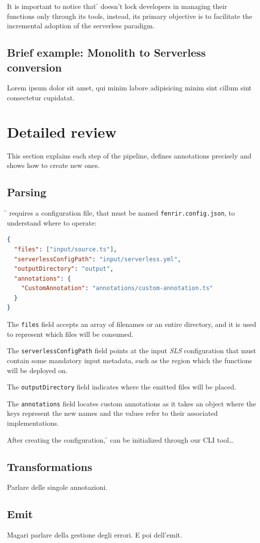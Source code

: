 It is important to notice that \f{} doesn't lock developers in managing their
functions only through its tools, instead, its primary objective is to facilitate
the incremental adoption of the serverless paradigm.

\subsection{Brief example: Monolith to Serverless conversion}

Lorem ipsum dolor sit amet, qui minim labore adipisicing minim sint cillum sint consectetur cupidatat.

\section{Detailed review}

This section explains each step of the pipeline, defines annotations precisely and shows how to create new ones.

\subsection{Parsing}

\f{} requires a configuration file, that must be named \verb|fenrir.config.json|, to understand where to operate:

\begin{lstlisting}[language=json]
{
  "files": ["input/source.ts"],
  "serverlessConfigPath": "input/serverless.yml",
  "outputDirectory": "output",
  "annotations": {
    "CustomAnnotation": "annotations/custom-annotation.ts"
  }
}
\end{lstlisting}

The \verb|files| field accepts an array of filenames or an entire directory,
and it is used to represent which files will be consumed.

The \verb|serverlessConfigPath| field points at the input \textit{SLS} configuration
that must contain some mandatory input metadata, such as the region which the functions will be deployed on.

The \verb|outputDirectory| field indicates where the emitted files will be placed.

The \verb|annotations| field locates custom annotations as it takes an object
where the keys represent the new names and the values refer to their associated implementations.

After creating the configuration, \f{} can be initialized through our CLI tool\dots

\subsection{Transformations}

Parlare delle singole annotazioni.

\subsection{Emit}

Magari parlare della gestione degli errori. E poi dell'emit.
